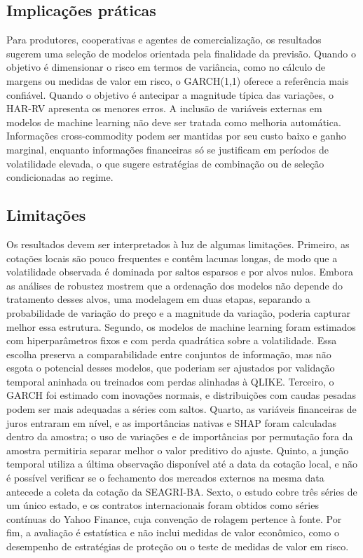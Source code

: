 \documentclass[a4paper,fleqn]{cas-sc}
\begin{document}
\subsection{Implicações práticas}
\label{subsec:disc_practical}

Para produtores, cooperativas e agentes de comercialização, os resultados sugerem uma seleção de modelos orientada pela finalidade da previsão. Quando o objetivo é dimensionar o risco em termos de variância, como no cálculo de margens ou medidas de valor em risco, o GARCH(1,1) oferece a referência mais confiável. Quando o objetivo é antecipar a magnitude típica das variações, o HAR-RV apresenta os menores erros. A inclusão de variáveis externas em modelos de machine learning não deve ser tratada como melhoria automática. Informações cross-commodity podem ser mantidas por seu custo baixo e ganho marginal, enquanto informações financeiras só se justificam em períodos de volatilidade elevada, o que sugere estratégias de combinação ou de seleção condicionadas ao regime.

\subsection{Limitações}
\label{subsec:disc_limitations}

Os resultados devem ser interpretados à luz de algumas limitações. Primeiro, as cotações locais são pouco frequentes e contêm lacunas longas, de modo que a volatilidade observada é dominada por saltos esparsos e por alvos nulos. Embora as análises de robustez mostrem que a ordenação dos modelos não depende do tratamento desses alvos, uma modelagem em duas etapas, separando a probabilidade de variação do preço e a magnitude da variação, poderia capturar melhor essa estrutura. Segundo, os modelos de machine learning foram estimados com hiperparâmetros fixos e com perda quadrática sobre a volatilidade. Essa escolha preserva a comparabilidade entre conjuntos de informação, mas não esgota o potencial desses modelos, que poderiam ser ajustados por validação temporal aninhada ou treinados com perdas alinhadas à QLIKE. Terceiro, o GARCH foi estimado com inovações normais, e distribuições com caudas pesadas podem ser mais adequadas a séries com saltos. Quarto, as variáveis financeiras de juros entraram em nível, e as importâncias nativas e SHAP foram calculadas dentro da amostra; o uso de variações e de importâncias por permutação fora da amostra permitiria separar melhor o valor preditivo do ajuste. Quinto, a junção temporal utiliza a última observação disponível até a data da cotação local, e não é possível verificar se o fechamento dos mercados externos na mesma data antecede a coleta da cotação da SEAGRI-BA. Sexto, o estudo cobre três séries de um único estado, e os contratos internacionais foram obtidos como séries contínuas do Yahoo Finance, cuja convenção de rolagem pertence à fonte. Por fim, a avaliação é estatística e não inclui medidas de valor econômico, como o desempenho de estratégias de proteção ou o teste de medidas de valor em risco.
\end{document}
